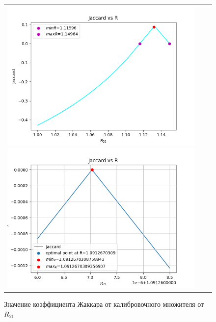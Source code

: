 \documentclass[a4paper,14pt]{article}
\begin{document}
	\begin{figure}[H]
		\begin{tabular}{ccc}
			\includegraphics[scale=0.5]{../image/jakkar.png}
			\includegraphics[scale=0.5]{../image/jakkar(smol).png}
		\end{tabular}
		\caption{Значение коэффициента Жаккара от калибровочного множителя от $R_{21}$} 
	\end{figure}
	
\end{document}
